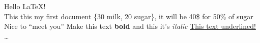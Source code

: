 \documentclass{article}
\begin{document}
	Hello LaTeX!\\ %
	This this my first \quad document %
	\{30 milk, 20 sugar\}, it will be 40\$ for 50\% of sugar %
	Nice to ``meet you''
	Make this text \textbf{bold} 
	and this it's \textit{italic}
	\underline{This text underlined!}
	\dots %
\end{document}
